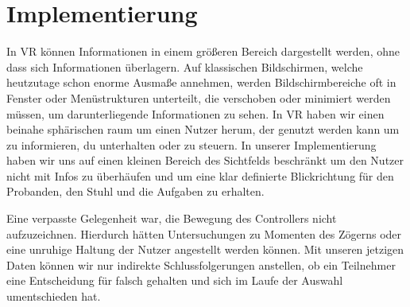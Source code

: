 \section{Implementierung}

In VR können Informationen in einem größeren Bereich dargestellt werden, ohne dass sich Informationen überlagern.
Auf klassischen Bildschirmen, welche heutzutage schon enorme Ausmaße annehmen, werden Bildschirmbereiche oft in Fenster oder Menüstrukturen unterteilt, die verschoben oder minimiert werden müssen, um darunterliegende Informationen zu sehen. 
In VR haben wir einen beinahe sphärischen raum um einen Nutzer herum, der genutzt werden kann um zu informieren, du unterhalten oder zu steuern. 
In unserer Implementierung haben wir uns auf einen kleinen Bereich des Sichtfelds beschränkt um den Nutzer nicht mit Infos zu überhäufen und um eine klar definierte Blickrichtung für den Probanden, den Stuhl und die Aufgaben zu erhalten.

Eine verpasste Gelegenheit war, die Bewegung des Controllers nicht aufzuzeichnen. Hierdurch hätten Untersuchungen zu Momenten des Zögerns oder eine unruhige Haltung der Nutzer angestellt werden können. Mit unseren jetzigen Daten können wir nur indirekte Schlussfolgerungen anstellen, ob ein Teilnehmer eine Entscheidung für falsch gehalten und sich im Laufe der Auswahl umentschieden hat.

